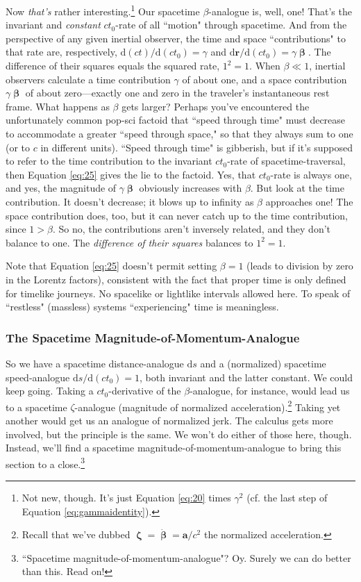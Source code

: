 \documentclass[12pt]{article}
\renewcommand{\vv}[1]{\mathbf{#1}}
\newcommand{\dd}[1]{\mathrm{d}#1}
\newcommand{\vvbeta}{\bm{\upbeta}}
\newcommand{\vvzeta}{\bm{\upzeta}}
\begin{document}
Now \emph{that's} rather interesting.\footnote{Not new, though. It's just Equation \ref{eq:20} times $\gamma^2$ (cf. the last step of Equation \ref{eq:gammaidentity}).} Our spacetime $\beta$-analogue is, well, one! That's the invariant and \emph{constant} $c t_0$-rate of all ``motion" through spacetime. And from the perspective of any given inertial observer, the time and space ``contributions" to that rate are, respectively, $\dd (ct) / \dd (c t_0) =\gamma$ and $\dd \vv r / \dd (c t_0) = \gamma \vvbeta$. The difference of their squares equals the squared rate, $1^2 = 1$. When $\beta \ll 1$, inertial observers calculate a time contribution $\gamma$ of about one, and a space contribution $\gamma \vvbeta$ of about zero---exactly one and zero in the traveler's instantaneous rest frame. What happens as $\beta$ gets larger? Perhaps you've encountered the unfortunately common pop-sci factoid that ``speed through time" must decrease to accommodate a greater ``speed through space," so that they always sum to one (or to $c$ in different units). ``Speed through time" is gibberish, but if it's supposed to refer to the time contribution to the invariant $ct_0$-rate of spacetime-traversal, then Equation \ref{eq:25} gives the lie to the factoid. Yes, that $ct_0$-rate is always one, and yes, the magnitude of $\gamma \vvbeta$ obviously increases with $\beta$. But look at the time contribution. It doesn't decrease; it blows up to infinity as $\beta$ approaches one! The space contribution does, too, but it can never catch up to the time contribution, since $1>\beta$. So no, the contributions aren't inversely related, and they don't balance to one. The \emph{difference of their squares} balances to $1^2=1$.

Note that Equation \ref{eq:25} doesn't permit setting $\beta=1$ (leads to division by zero in the Lorentz factors), consistent with the fact that proper time is only defined for timelike journeys. No spacelike or lightlike intervals allowed here. To speak of ``restless" (massless) systems ``experiencing" time is meaningless.

\subsubsection{The Spacetime Magnitude-of-Momentum-Analogue}\label{sssec:pc}

So we have a spacetime distance-analogue $\dd s$ and a (normalized) spacetime speed-analogue $\dd s/\dd (c t_0)=1$, both invariant and the latter constant. We could keep going. Taking a $c t_0$-derivative of the $\beta$-analogue, for instance, would lead us to a spacetime $\zeta$-analogue (magnitude of normalized acceleration).\footnote{Recall that we've dubbed $\vvzeta = \dot{\vvbeta} = \vv a / c^2$ the normalized acceleration.} Taking yet another would get us an analogue of normalized jerk. The calculus gets more involved, but the principle is the same. We won't do either of those here, though. Instead, we'll find a spacetime magnitude-of-momentum-analogue to bring this section to a close.\footnote{``Spacetime magnitude-of-momentum-analogue"? Oy. Surely we can do better than this. Read on!}
\end{document}
